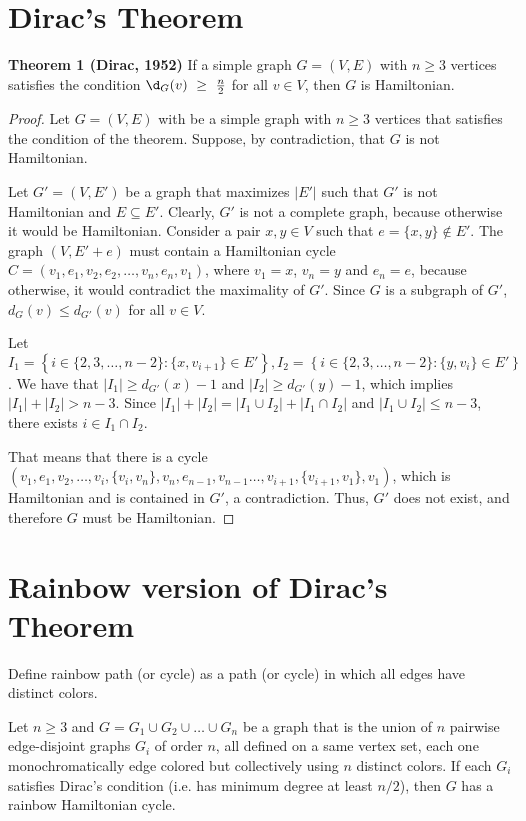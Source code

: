 \section{Dirac's Theorem}

\textbf{Theorem 1 (Dirac, 1952)} If a simple graph $G = (V, E)$ with $n \geq 3$ vertices satisfies the condition $\d_G(v)~\geq~\frac{n}{2}$ for all $v \in V$, 
then $G$ is Hamiltonian.

\begin{proof}
    Let $G = (V, E)$ with be a simple graph with $n \geq 3$ vertices that satisfies the condition of the theorem. Suppose, 
    by contradiction, that $G$ is not Hamiltonian. 

    Let $G' = (V, E')$ be a graph that maximizes $|E'|$ such that $G'$ is not Hamiltonian and $E \subseteq E'$. 
    Clearly, $G'$ is not a complete graph, because otherwise it would be Hamiltonian. Consider a pair $x, y \in V$ such that 
    $e = \{x, y\} \not\in E'$.
    The graph $(V, E' + e)$ must contain a Hamiltonian cycle $C = (v_1, e_1, v_2, e_2, \ldots, v_n, e_{n}, v_1)$, where 
    $v_1 = x$, $v_n = y$ and $e_n = e$, because otherwise, it would contradict the maximality of $G'$.
    Since $G$ is a subgraph of $G'$, $d_G(v) \leq d_{G'}(v)$ for all $v \in V$.

    Let $I_1 = \left\{i \in \{2, 3, \dots, n-2\} : \{x, v_{i+1}\} \in E'\right\}, 
    I_2 = \left\{ i \in \{2, 3, \dots, n - 2\} : \{y, v_{i}\} \in E' \right\}$.
    We have that $|I_1| \geq d_{G'}(x) - 1$ and $|I_2| \geq d_{G'}(y) - 1$,
    which implies $|I_1| + |I_2| > n - 3$. 
    Since $|I_1| + |I_2| = |I_1 \cup I_2| + |I_1 \cap I_2|$ and $|I_1 \cup I_2| \leq n - 3$, 
    there exists $i \in I_1 \cap I_2$.

    That means that there is a cycle 
    $(v_1, e_1, v_2, \dots, v_i, \{v_i, v_n\}, v_n, e_{n - 1}, v_{n-1} \dots , v_{i+1}, \{v_{i+1}, v_1\}, v_1)$, 
    which is Hamiltonian and is contained in $G'$, a contradiction. Thus, $G'$ does not exist,
    and therefore $G$ must be Hamiltonian.

\end{proof}

\section{Rainbow version of Dirac's Theorem}

Define rainbow path (or cycle) as a path (or cycle) in which all edges have distinct colors.

Let $n\geq 3$ and $G = G_1 \cup G_2 \cup \ldots \cup
G_n$ be a graph that is the union of $n$ pairwise edge-disjoint graphs
$G_i$ of order $n$, all defined on a same vertex set, each one
monochromatically edge colored but collectively using $n$ distinct
colors. If each $G_i$ satisfies Dirac's condition (i.e. has minimum 
degree at least $n/2$), then $G$ has a rainbow Hamiltonian cycle.
